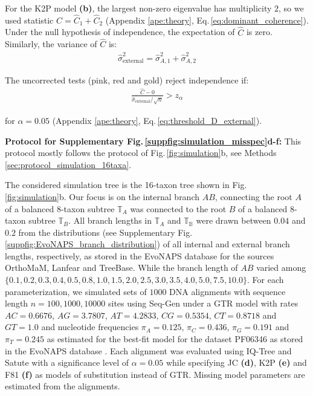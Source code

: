 \begin{appendices}
 For the K2P model \textbf{(b)}, the largest non-zero eigenvalue  has multiplicity $2$, so we used statistic $\hat{C} = \hat{C}_1+\hat{C}_2$ (Appendix \ref{ape:theory}, Eq.\,\eqref{eq:dominant_coherence}). Under the null hypothesis of independence, the expectation of $\hat{C}$ is zero. Similarly, the variance of $\hat C$ is:
\begin{align*}
  \hat{\sigma}^2_{\text{external}} =  \hat{\sigma}^2_{A,1}+\hat{\sigma}^2_{A,2}
\end{align*}

The uncorrected tests ({\color{truetree}pink}, {\color{truetreeML}red} and {\color{truetreeNoMisspecification}gold}) reject independence if:
\begin{align*}
 \frac{\hat{C}-0}{\hat{\sigma}_{\text{external}}/\sqrt{n}} > z_\alpha 
\end{align*}

for $\alpha=0.05$ (Appendix \ref{ape:theory}, Eq.\,\eqref{eq:threshold_D_external}).

\medskip

\noindent\textbf{Protocol for Supplementary Fig.\,\ref{suppfig:simulation_misspec}d-f:}\label{subsec:misspec_16tree} This protocol mostly follows the protocol of Fig.\,\ref{fig:simulation}b, see Methods \ref{sec:protocol_simulation_16taxa}.

\medskip

\noindent The considered simulation tree is the 16-taxon tree shown in Fig.\,\ref{fig:simulation}b. Our focus is on the internal branch $AB$, connecting the root $A$ of a balanced $8$-taxon subtree $\mathbb{T}_A$ was connected to the root $B$ of a balanced $8$-taxon subtree $\mathbb{T}_B$. All branch lengths in $\mathbb{T}_A$ and $\mathbb{T_B}$ were drawn between $0.04$ and $0.2$ from the distributions (see Supplementary Fig.\,\ref{suppfig:EvoNAPS_branch_distribution}) of all internal and external branch lengths, respectively, as stored in the EvoNAPS database  for the sources OrthoMaM, Lanfear and TreeBase. While the branch length of $AB$ varied among $\{0.1, 0.2, 0.3, 0.4, 0.5, 0.8, 1.0, 1.5, 2.0, 2.5, 3.0, 3.5, 4.0, 5.0, 7.5, 10.0\}$. For each parameterization, we simulated sets of $1000$ DNA alignments with sequence length ${n = 100, 1000, 10000}$ sites using Seq-Gen  under a GTR model with rates $AC=0.6676$, $AG=3.7807$, $AT=4.2833$, $CG=0.5354$, $CT=0.8718$ and $GT=1.0$ and nucleotide frequencies $\pi_A = 0.125$, $\pi_C = 0.436$, $\pi_G = 0.191$ and $\pi_T =0.245$ as estimated for the best-fit model for the dataset PF06346 as stored in the EvoNAPS database . Each alignment was evaluated using IQ-Tree  and Satute with a significance level of $\alpha = 0.05$ while specifying JC \textbf{(d)}, K2P \textbf{(e)} and F81 \textbf{(f)} as models of substitution instead of GTR. Missing model parameters are estimated from the alignments.


\end{appendices}
